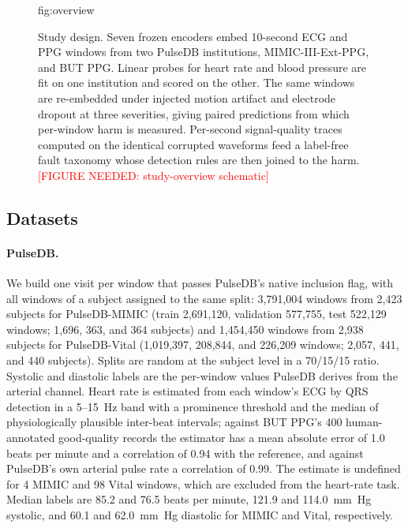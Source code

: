 \documentclass[pmlr,twocolumn,10pt]{jmlr}
\newcommand{\placeholder}[1]{\textcolor{red}{[#1]}}
\begin{document}
\begin{figure}[t]
\floatconts
  {fig:overview}
  {\caption{Study design. Seven frozen encoders embed 10-second ECG and PPG windows from two PulseDB institutions, MIMIC-III-Ext-PPG, and BUT PPG. Linear probes for heart rate and blood pressure are fit on one institution and scored on the other. The same windows are re-embedded under injected motion artifact and electrode dropout at three severities, giving paired predictions from which per-window harm is measured. Per-second signal-quality traces computed on the identical corrupted waveforms feed a label-free fault taxonomy whose detection rules are then joined to the harm. \placeholder{FIGURE NEEDED: study-overview schematic}}}
  {\fbox{\parbox{0.96\linewidth}{\centering\vspace{1.2cm}\placeholder{Figure 1 placeholder: study-overview schematic to be drawn}\vspace{1.2cm}}}}
\end{figure}

\subsection{Datasets}
\label{sec:data}

\paragraph{PulseDB.}
We build one visit per window that passes PulseDB's native inclusion flag, with all windows of a subject assigned to the same split: 3,791,004 windows from 2,423 subjects for PulseDB-MIMIC (train 2,691,120, validation 577,755, test 522,129 windows; 1,696, 363, and 364 subjects) and 1,454,450 windows from 2,938 subjects for PulseDB-Vital (1,019,397, 208,844, and 226,209 windows; 2,057, 441, and 440 subjects). Splits are random at the subject level in a 70/15/15 ratio. Systolic and diastolic labels are the per-window values PulseDB derives from the arterial channel. Heart rate is estimated from each window's ECG by QRS detection in a 5--15~\si{\hertz} band with a prominence threshold and the median of physiologically plausible inter-beat intervals; against BUT PPG's 400 human-annotated good-quality records the estimator has a mean absolute error of 1.0 beats per minute and a correlation of 0.94 with the reference, and against PulseDB's own arterial pulse rate a correlation of 0.99. The estimate is undefined for 4 MIMIC and 98 Vital windows, which are excluded from the heart-rate task. Median labels are 85.2 and 76.5 beats per minute, 121.9 and 114.0~\si{\milli\meter Hg} systolic, and 60.1 and 62.0~\si{\milli\meter Hg} diastolic for MIMIC and Vital, respectively.
\end{document}
